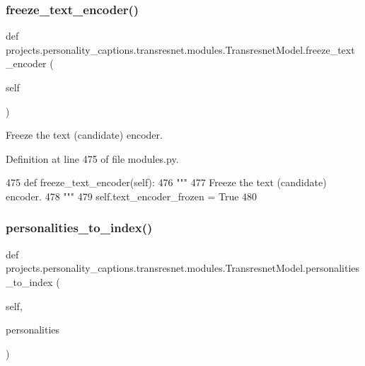 \subsubsection{\texorpdfstring{freeze\+\_\+text\+\_\+encoder()}{freeze\_text\_encoder()}}
{\footnotesize\ttfamily def projects.\+personality\+\_\+captions.\+transresnet.\+modules.\+Transresnet\+Model.\+freeze\+\_\+text\+\_\+encoder (\begin{DoxyParamCaption}\item[{}]{self }\end{DoxyParamCaption})}

\begin{DoxyVerb}Freeze the text (candidate) encoder.
\end{DoxyVerb}
 

Definition at line 475 of file modules.\+py.


\begin{DoxyCode}
475     \textcolor{keyword}{def }freeze\_text\_encoder(self):
476         \textcolor{stringliteral}{"""}
477 \textcolor{stringliteral}{        Freeze the text (candidate) encoder.}
478 \textcolor{stringliteral}{        """}
479         self.text\_encoder\_frozen = \textcolor{keyword}{True}
480 
\end{DoxyCode}
\mbox{\label{classprojects_1_1personality__captions_1_1transresnet_1_1modules_1_1TransresnetModel_a3d8ccc4b989803cc17f5976730016c6c}} 
\subsubsection{\texorpdfstring{personalities\+\_\+to\+\_\+index()}{personalities\_to\_index()}}
{\footnotesize\ttfamily def projects.\+personality\+\_\+captions.\+transresnet.\+modules.\+Transresnet\+Model.\+personalities\+\_\+to\+\_\+index (\begin{DoxyParamCaption}\item[{}]{self,  }\item[{}]{personalities }\end{DoxyParamCaption})}

